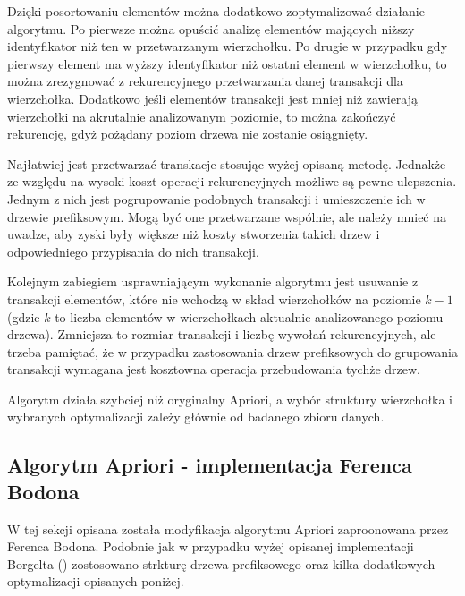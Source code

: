 Dzięki posortowaniu elementów można dodatkowo zoptymalizować działanie algorytmu. Po pierwsze można opuścić analizę elementów mających niższy identyfikator niż ten w przetwarzanym wierzchołku. Po drugie w przypadku gdy pierwszy element ma wyższy identyfikator niż ostatni element w wierzchołku, to można zrezygnować z rekurencyjnego przetwarzania danej transakcji dla wierzchołka. Dodatkowo jeśli elementów transakcji jest mniej niż zawierają wierzchołki na akrutalnie analizowanym poziomie, to można zakończyć rekurencję, gdyż pożądany poziom drzewa nie zostanie osiągnięty.

Najłatwiej jest przetwarzać transkacje stosując wyżej opisaną metodę. Jednakże ze względu na wysoki koszt operacji rekurencyjnych możliwe są pewne ulepszenia. Jednym z nich jest pogrupowanie podobnych transakcji i umieszczenie ich w drzewie prefiksowym. Mogą być one przetwarzane wspólnie, ale należy mnieć na uwadze, aby zyski były większe niż koszty stworzenia takich drzew i odpowiedniego przypisania do nich transakcji. 

Kolejnym zabiegiem usprawniającym wykonanie algorytmu jest usuwanie z transakcji elementów, które nie wchodzą w skład wierzchołków na poziomie \(k-1\) (gdzie \(k\) to liczba elementów w wierzchołkach aktualnie analizowanego poziomu drzewa). Zmniejsza to rozmiar transakcji i liczbę wywołań rekurencyjnych, ale trzeba pamiętać, że w przypadku zastosowania drzew prefiksowych do grupowania transakcji wymagana jest kosztowna operacja przebudowania tychże drzew.

Algorytm działa szybciej niż oryginalny Apriori, a wybór struktury wierzchołka i wybranych optymalizacji zależy głównie od badanego zbioru danych. 

\subsection{Algorytm Apriori - implementacja Ferenca Bodona \cite{Bodon}}
\label{c323}
W tej sekcji opisana została modyfikacja algorytmu Apriori zaproonowana przez Ferenca Bodona. Podobnie jak w przypadku wyżej opisanej implementacji Borgelta (\cite{Borgelt}) zostosowano strkturę drzewa prefiksowego oraz kilka dodatkowych optymalizacji opisanych poniżej. 

